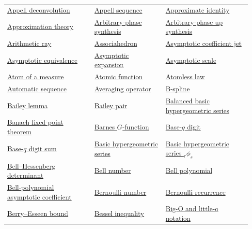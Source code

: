 \documentclass[11pt,oneside]{article}
\begin{document}
\begin{longtable}{L{0.31\textwidth}L{0.31\textwidth}L{0.31\textwidth}}
\hyperlink{gls:appell-deconvolution}{Appell deconvolution} & \hyperlink{gls:appell-sequence}{Appell sequence} & \hyperlink{gls:approximate-identity}{Approximate identity} \\
\hyperlink{gls:approximation-theory}{Approximation theory} & \hyperlink{gls:arbitrary-phase-synthesis}{Arbitrary-phase synthesis} & \hyperlink{gls:arbitrary-phase-up-synthesis}{Arbitrary-phase up synthesis} \\
\hyperlink{gls:arithmetic-ray}{Arithmetic ray} & \hyperlink{gls:associahedron}{Associahedron} & \hyperlink{gls:asymptotic-coefficient-jet}{Asymptotic coefficient jet} \\
\hyperlink{gls:asymptotic-equivalence}{Asymptotic equivalence} & \hyperlink{gls:asymptotic-expansion}{Asymptotic expansion} & \hyperlink{gls:asymptotic-scale}{Asymptotic scale} \\
\hyperlink{gls:atom-of-a-measure}{Atom of a measure} & \hyperlink{gls:atomic-function}{Atomic function} & \hyperlink{gls:atomless-law}{Atomless law} \\
\hyperlink{gls:automatic-sequence}{Automatic sequence} & \hyperlink{gls:averaging-operator}{Averaging operator} & \hyperlink{gls:b-spline}{B-spline} \\
\hyperlink{gls:bailey-lemma}{Bailey lemma} & \hyperlink{gls:bailey-pair}{Bailey pair} & \hyperlink{gls:balanced-basic-hypergeometric-series}{Balanced basic hypergeometric series} \\
\hyperlink{gls:banach-fixed-point-theorem}{Banach fixed-point theorem} & \hyperlink{gls:barnes-g-function}{Barnes \(G\)-function} & \hyperlink{gls:base-q-digit}{Base-\(q\) digit} \\
\hyperlink{gls:base-q-digit-sum}{Base-\(q\) digit sum} & \hyperlink{gls:basic-hypergeometric-series}{Basic hypergeometric series} & \hyperlink{gls:basic-hypergeometric-r-s-phi}{Basic hypergeometric series \({}_r\phi_s\)} \\
\hyperlink{gls:bell-hessenberg-determinant}{Bell--Hessenberg determinant} & \hyperlink{gls:bell-number}{Bell number} & \hyperlink{gls:bell-polynomial}{Bell polynomial} \\
\hyperlink{gls:bell-polynomial-asymptotic-coefficient}{Bell-polynomial asymptotic coefficient} & \hyperlink{gls:bernoulli-number}{Bernoulli number} & \hyperlink{gls:bernoulli-recurrence}{Bernoulli recurrence} \\
\hyperlink{gls:berry-esseen-bound}{Berry--Esseen bound} & \hyperlink{gls:bessel-inequality}{Bessel inequality} & \hyperlink{gls:big-o-and-little-o}{Big-O and little-o notation} \\

\end{longtable}
\end{document}
